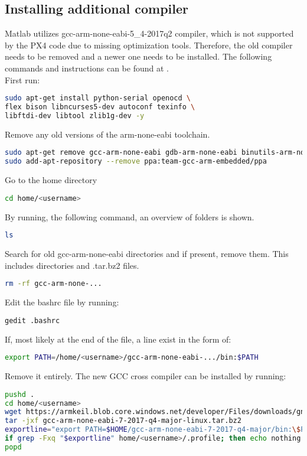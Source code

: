 \subsection{Installing additional compiler}
Matlab utilizes gcc-arm-none-eabi-5\_4-2017q2 compiler, which is not supported by the PX4 code due to missing optimization tools. Therefore, the old compiler needs to be removed and a newer one needs to be installed. The following commands and instructions can be found at \cite{GCC_Compiler}.\\
First run:
\begin{lstlisting}[language=sh]
sudo apt-get install python-serial openocd \
flex bison libncurses5-dev autoconf texinfo \
libftdi-dev libtool zlib1g-dev -y
\end{lstlisting}
Remove any old versions of the arm-none-eabi toolchain.
\begin{lstlisting}[language=sh]
sudo apt-get remove gcc-arm-none-eabi gdb-arm-none-eabi binutils-arm-none-eabi gcc-arm-embedded
sudo add-apt-repository --remove ppa:team-gcc-arm-embedded/ppa
\end{lstlisting}
Go to the home directory
\begin{lstlisting}[language=sh]
cd home/<username>
\end{lstlisting}
By running, the following command, an overview of folders is shown.
\begin{lstlisting}[language=sh]
ls
\end{lstlisting}
Search for old gcc-arm-none-eabi directories and if present, remove them. This includes directories and .tar.bz2 files.
\begin{lstlisting}[language=sh]
rm -rf gcc-arm-none-...
\end{lstlisting}
Edit the bashrc file by running:
\begin{lstlisting}[language=sh]
gedit .bashrc
\end{lstlisting}
If, most likely at the end of the file, a line exist in the form of:
\begin{lstlisting}[language=sh]
export PATH=/home/<username>/gcc-arm-none-eabi-.../bin:$PATH
\end{lstlisting}
Remove it entirely. The new GCC cross compiler can be installed by running:
\begin{lstlisting}[language=sh, breaklines=true]
pushd .
cd home/<username>
wget https://armkeil.blob.core.windows.net/developer/Files/downloads/gnu-rm /7-2017q4/gcc-arm-none-eabi-7-2017-q4-major-linux.tar.bz2
tar -jxf gcc-arm-none-eabi-7-2017-q4-major-linux.tar.bz2
exportline="export PATH=$HOME/gcc-arm-none-eabi-7-2017-q4-major/bin:\$PATH"
if grep -Fxq "$exportline" home/<username>/.profile; then echo nothing to do ; else echo $exportline >> home/<username>/.profile; fi
popd
\end{lstlisting}
